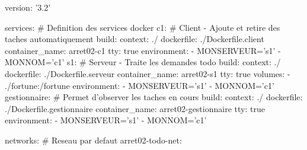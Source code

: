 \begin{code}[title=\texttt{arret02/docker-compose.yml}, listing options={language=yaml}]
version: '3.2'

services: # Definition des services docker
    c1: # Client - Ajoute et retire des taches automatiquement
      build:
        context: ./
        dockerfile: ./Dockerfile.client
      container_name: arret02-c1
      tty: true
      environment:
        - MONSERVEUR='s1'
        - MONNOM='c1'
    s1: # Serveur - Traite les demandes todo
      build:
        context: ./
        dockerfile: ./Dockerfile.serveur
      container_name: arret02-s1
      tty: true
      volumes:
        - ./fortune:/fortune
      environment:
        - MONSERVEUR='s1'
        - MONNOM='c1'
    gestionnaire: # Permet d'observer les taches en cours
      build:
        context: ./
        dockerfile: ./Dockerfile.gestionnaire
      container_name: arret02-gestionnaire
      tty: true
      environment:
        - MONSERVEUR='s1'
        - MONNOM='c1'

networks: # Reseau par defaut
  arret02-todo-net:
\end{code}
